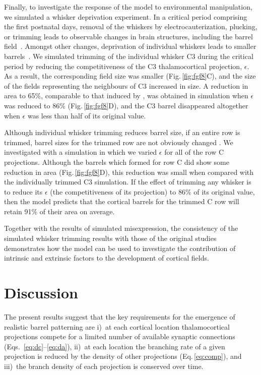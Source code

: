 \documentclass[9pt,lineno]{elife}
\newcommand{\cmnt}[1]{\textcolor{colcmnt}{#1}}
\begin{document}
\cmnt{Finally, to investigate the response of the model to
  environmental manipulation, we simulated a whisker deprivation
  experiment. In a critical period comprising the first postnatal days,
  removal of the whiskers by electrocauterization, plucking, or trimming leads
  to observable changes in brain structures, including the barrel
  field~\citep{jeanmonod_mouse_1981}. Amongst other changes, deprivation of
  individual whiskers leads to smaller
  barrels~\citep{kossut_effects_1992}. We simulated
  trimming of the individual whisker C3 during the critical period by reducing
  the competitiveness of the C3 thalamocortical projection, $\epsilon$. As a
  result, the corresponding field size was smaller (Fig.\,\ref{fig:fgf8}C),
  and the size of the fields representing the neighbours of C3 increased in
  size. A reduction in area to 65\%, comparable to that induced by
  \cite{kossut_effects_1992}, was obtained in simulation when $\epsilon$
  was reduced to 86\% (Fig.\,\ref{fig:fgf8}D), and the C3 barrel disappeared
  altogether when $\epsilon$ was less than half of its original value.}

\cmnt{Although individual whisker trimming reduces barrel size, if an
  entire row is trimmed, barrel sizes for the trimmed row are not obviously
  changed \citep{land_metabolic_1985}. We investigated with a simulation in
  which we varied $\epsilon$ for all of the row C projections.  Although the
  barrels which formed for row C did show some reduction in area
  (Fig.\,\ref{fig:fgf8}D), this reduction was small when compared with the
  individually trimmed C3 simulation. If the effect of trimming any whisker is
  to reduce its $\epsilon$ (the competitiveness of its projection) to 86\% of
  its original value, then the model predicts that the cortical barrels for
  the trimmed C row will retain 91\% of their area on average.}

\cmnt{Together with the results of simulated misexpression, the
  consistency of the simulated whisker trimming results with those of the
  original studies demonstrates how the model can be used to investigate the
  contribution of intrinsic and extrinsic factors to the development of
  cortical fields.}

\section{Discussion}

The present results suggest that the key requirements for the emergence of
realistic barrel patterning are i)~at each cortical location thalamocortical
projections compete for a limited number of available synaptic connections
(Eqs.~\ref{eq:dc}--\ref{eq:da}), ii)~at each location the branching rate of a
given projection is reduced by the density of other projections
(Eq.\,\ref{eq:comp}), and iii)~the branch density of each projection is
conserved over time.
\end{document}
